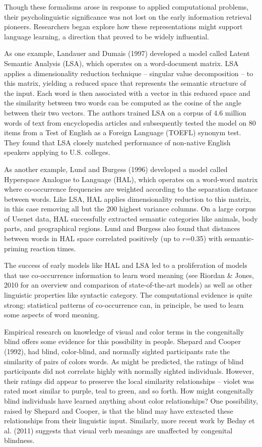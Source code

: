 \documentclass[man,floatsintext]{apa6}
\begin{document}
Though these formalisms arose in response to applied computational problems, their psycholinguistic significance was not lost on the early information retrieval pioneers. Researchers began explore how these representations might support language learning, a direction that proved to be widely influential.

As one example, Landauer and Dumais (1997) developed a model called Latent Semantic Analysis (LSA), which operates on a word-document matrix. LSA applies a dimensionality reduction technique -- singular value decomposition -- to this matrix, yielding a reduced space that represents the semantic structure of the input. Each word is then associated with a vector in this reduced space and the similarity between two words can be computed as the cosine of the angle between their two vectors. The authors trained LSA on a corpus of 4.6 million words of text from encyclopedia articles and subsequently tested the model on 80 items from a Test of English as a Foreign Language (TOEFL) synonym test. They found that LSA closely matched performance of non-native English speakers applying to U.S. colleges. 

As another example, Lund and Burgess (1996) developed a model called Hyperspace Analogue to Language (HAL), which operates on a word-word matrix where co-occurrence frequencies are weighted according to the separation distance between words. Like LSA, HAL applies dimensionality reduction to this matrix, in this case removing all but the 200 highest variance columns. On a large corpus of Usenet data, HAL successfully extracted semantic categories like animals, body parts, and geographical regions. Lund and Burgess also found that distances between words in HAL space correlated positively (up to $r$=0.35) with semantic-priming reaction times.

The success of early models like HAL and LSA led to a proliferation of models that use co-occurrence information to learn word meaning (see Riordan \& Jones, 2010 for an overview and comparison of state-of-the-art models) as well as other linguistic properties like syntactic category. The computational evidence is quite strong: statistical patterns of co-occurrence can, in principle, be used to learn some aspects of word meaning.

Empirical research on knowledge of visual and color terms in the congenitally blind offers some evidence for this possibility in people. Shepard and Cooper (1992), had blind, color-blind, and normally sighted participants rate the similarity of pairs of colors words. As might be predicted, the ratings of blind participants did not correlate highly with normally sighted individuals. However, their ratings did appear to preserve the local similarity relationships -- violet was rated most similar to purple, teal to green, and so forth. How might congenitally blind individuals have learned anything about color relationships? One possibility, raised by Shepard and Cooper, is that the blind may have extracted these relationships from their linguistic input. Similarly, more recent work by Bedny et al. (2011) suggests that visual verb meanings are unaffected by congenital blindness. %
\end{document}
